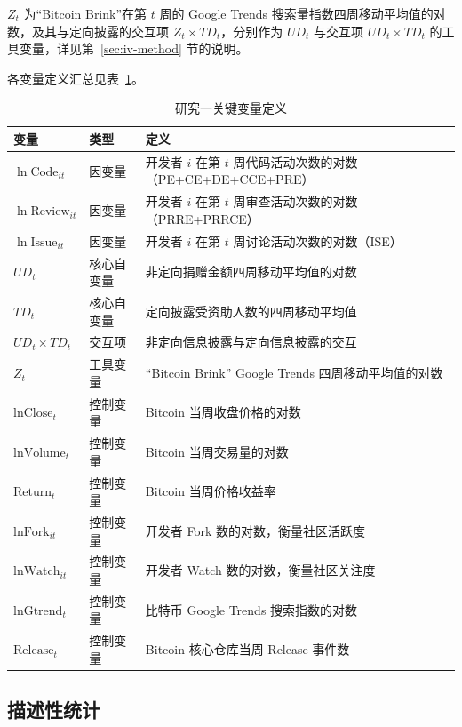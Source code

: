 \documentclass[
    type = master, %
    degree = professional,        %
    decl-page,  %
    twoside,                %
    fontset = fandol %
  ]{njuthesis}
\begin{document}
$Z_t$ 为“Bitcoin Brink”在第 $t$ 周的 Google Trends 搜索量指数四周移动平均值的对数，及其与定向披露的交互项 $Z_t \times TD_t$，分别作为 $UD_t$ 与交互项 $UD_t \times TD_t$ 的工具变量，详见第~\ref{sec:iv-method} 节的说明。

各变量定义汇总见表~\ref{tab:variables-1}。

\begin{table}[htbp]
    \centering
    \caption{研究一关键变量定义}
    \label{tab:variables-1}
    \begin{tabularx}{\textwidth}{p{4.2cm}p{1.8cm}X}
        \toprule
        变量 & 类型 & 定义 \\
        \midrule
        $\ln\text{Code}_{it}$ & 因变量 & 开发者 $i$ 在第 $t$ 周代码活动次数的对数（PE+CE+DE+CCE+PRE） \\
        $\ln\text{Review}_{it}$ & 因变量 & 开发者 $i$ 在第 $t$ 周审查活动次数的对数（PRRE+PRRCE） \\
        $\ln\text{Issue}_{it}$ & 因变量 & 开发者 $i$ 在第 $t$ 周讨论活动次数的对数（ISE） \\
        $UD_t$ & 核心自变量 & 非定向捐赠金额四周移动平均值的对数 \\
        $TD_t$ & 核心自变量 & 定向披露受资助人数的四周移动平均值 \\
        $UD_t \times TD_t$ & 交互项 & 非定向信息披露与定向信息披露的交互 \\
        $Z_t$ & 工具变量 & “Bitcoin Brink” Google Trends 四周移动平均值的对数 \\
        $\text{lnClose}_t$ & 控制变量 & Bitcoin 当周收盘价格的对数 \\
        $\text{lnVolume}_t$ & 控制变量 & Bitcoin 当周交易量的对数 \\
        $\text{Return}_t$ & 控制变量 & Bitcoin 当周价格收益率 \\
        $\text{lnFork}_{it}$ & 控制变量 & 开发者 Fork 数的对数，衡量社区活跃度 \\
        $\text{lnWatch}_{it}$ & 控制变量 & 开发者 Watch 数的对数，衡量社区关注度 \\
        $\text{lnGtrend}_t$ & 控制变量 & 比特币 Google Trends 搜索指数的对数 \\
        $\text{Release}_t$ & 控制变量 & Bitcoin 核心仓库当周 Release 事件数 \\
        \bottomrule
    \end{tabularx}
\end{table}

\subsection{描述性统计}
\end{document}

